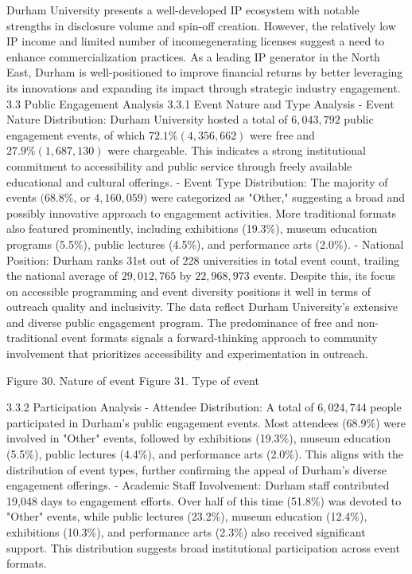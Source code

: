 Durham University presents a well-developed IP ecosystem with notable strengths in disclosure volume and spin-off creation. However, the relatively low IP income and limited number of incomegenerating licenses suggest a need to enhance commercialization practices. As a leading IP generator in the North East, Durham is well-positioned to improve financial returns by better leveraging its innovations and expanding its impact through strategic industry engagement.
3.3 Public Engagement Analysis
3.3.1 Event Nature and Type Analysis
- Event Nature Distribution: Durham University hosted a total of $6,043,792$ public engagement events, of which $72.1 \%(4,356,662)$ were free and $27.9 \%(1,687,130)$ were chargeable. This indicates a strong institutional commitment to accessibility and public service through freely available educational and cultural offerings.
- Event Type Distribution: The majority of events $(68.8 \%$, or $4,160,059)$ were categorized as "Other," suggesting a broad and possibly innovative approach to engagement activities. More traditional formats also featured prominently, including exhibitions (19.3\%), museum education programs (5.5\%), public lectures (4.5\%), and performance arts (2.0\%).
- National Position: Durham ranks 31st out of 228 universities in total event count, trailing the national average of $29,012,765$ by $22,968,973$ events. Despite this, its focus on accessible programming and event diversity positions it well in terms of outreach quality and inclusivity.
The data reflect Durham University's extensive and diverse public engagement program. The predominance of free and non-traditional event formats signals a forward-thinking approach to community involvement that prioritizes accessibility and experimentation in outreach.

Figure 30. Nature of event 
Figure 31. Type of event

3.3.2 Participation Analysis
- Attendee Distribution: A total of $6,024,744$ people participated in Durham's public engagement events. Most attendees (68.9\%) were involved in "Other" events, followed by exhibitions (19.3\%), museum education (5.5\%), public lectures (4.4\%), and performance arts (2.0\%). This aligns with the distribution of event types, further confirming the appeal of Durham's diverse engagement offerings.
- Academic Staff Involvement: Durham staff contributed 19,048 days to engagement efforts. Over half of this time (51.8\%) was devoted to "Other" events, while public lectures (23.2\%), museum education (12.4\%), exhibitions (10.3\%), and performance arts (2.3\%) also received significant support. This distribution suggests broad institutional participation across event formats.

